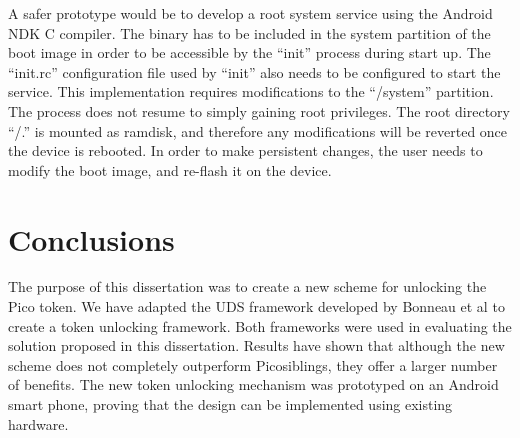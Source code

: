 A safer prototype would be to develop a root system service using the Android NDK C compiler. The binary has to be included in the system partition of the boot image in order to be accessible by the ``init'' process during start up. The ``init.rc'' configuration file used by ``init'' also needs to be configured to start the service. This implementation requires modifications to the ``/system'' partition. The process does not resume to simply gaining root privileges. The root directory ``/.'' is mounted as ramdisk, and therefore any modifications will be reverted once the device is rebooted. In order to make persistent changes, the user needs to modify the boot image, and re-flash it on the device.

\section{Conclusions}
The purpose of this dissertation was to create a new scheme for unlocking the Pico token. We have adapted the UDS framework developed by Bonneau et al \cite{bonneau2012quest} to create a token unlocking framework. Both frameworks were used in evaluating the solution proposed in this dissertation. Results have shown that although the new scheme does not completely outperform Picosiblings, they offer a larger number of benefits. The new token unlocking mechanism was prototyped on an Android smart phone, proving that the design can be implemented using existing hardware.


